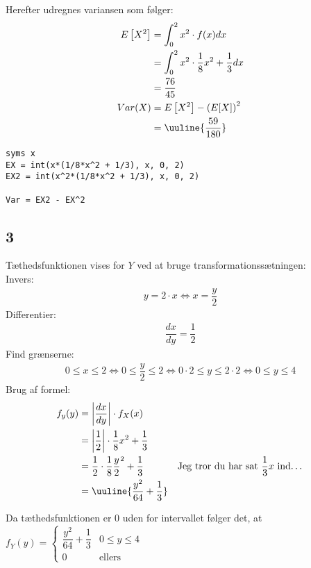 \documentclass{article}
\begin{document}
Herefter udregnes variansen som følger:
\begin{align}
E\left[ X^2 \right] &= \int_0^2 x^2 \cdot f(x) dx \\
	&= \int_0^2 x^2 \cdot \dfrac{1}{8} x^2 + \dfrac{1}{3} dx \\
	&= \dfrac{76}{45} \\
Var(X) &= E\left[ X^2 \right] - \left(E[X]\right)^2 \\
	&= \uuline{\dfrac{59}{180}}
\end{align}

\begin{lstlisting}[caption=Opgave 1 del 2, style=Code-Matlab, label=lst:opg12]
syms x
EX = int(x*(1/8*x^2 + 1/3), x, 0, 2)
EX2 = int(x^2*(1/8*x^2 + 1/3), x, 0, 2)

Var = EX2 - EX^2
\end{lstlisting}

\subsection*{3} %
Tæthedsfunktionen vises for $Y$ ved at bruge transformationssætningen:
\\
Invers:
\begin{align}
y = 2 \cdot x \Leftrightarrow x = \dfrac{y}{2}
\end{align}
Differentier:
\begin{align}
\dfrac{dx}{dy} = \dfrac{1}{2}
\end{align}
Find grænserne:
\begin{align}
0 \leq x \leq 2 \Leftrightarrow 0 \leq \dfrac{y}{2} \leq 2 \Leftrightarrow 0 \cdot 2 \leq y \leq 2 \cdot 2 \Leftrightarrow 0 \leq y \leq 4
\end{align}
Brug af formel:
\begin{align}
f_y(y) &= \left| \dfrac{dx}{dy} \right| \cdot f_X(x) \\
	&= \left| \dfrac{1}{2}\right| \cdot \dfrac{1}{8} x^2 + \dfrac{1}{3} \\
	&= \dfrac{1}{2} \cdot \dfrac{1}{8} \dfrac{y}{2}^2 + \dfrac{1}{3} & \text{Jeg tror du har sat } \dfrac{1}{3} x \text{ ind\dots}\\
	&= \uuline{\dfrac{y^2}{64}+\dfrac{1}{3}} 
\end{align} 

Da tæthedsfunktionen er 0 uden for intervallet følger det, at 
$ f_Y(y) = 
\begin{cases}
\dfrac{y^2}{64}+\dfrac{1}{3} & 0 \leq y \leq 4 \\
0 & \text{ellers}
\end{cases}$
\end{document}
